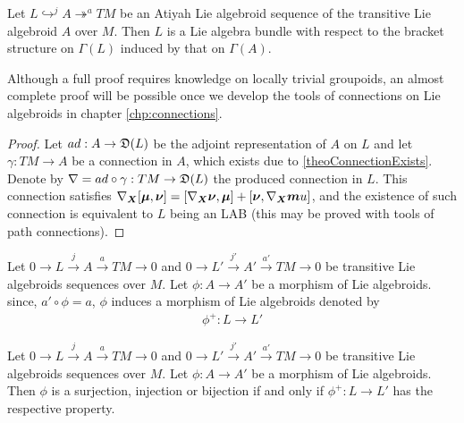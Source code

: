 \begin{theorem}\label{theoAdjointLAB} %
Let $L \hookrightarrow^j A \twoheadrightarrow^a TM$ be an Atiyah Lie algebroid sequence of the transitive Lie algebroid $A$ over $M$. Then $L$ is a Lie algebra bundle with respect to the bracket structure on $\Gamma(L)$ induced by that on $\Gamma(A)$.
\end{theorem}
Although a full proof requires knowledge on locally trivial groupoids, an almost complete proof will be possible once we develop the tools of connections on Lie algebroids in chapter \ref{chp:connections}. 
\begin{proof}
Let $ad: A \to \mathfrak{D}(L)$ be the adjoint representation of $A$ on $L$ and let $\gamma: TM \to A$ be a connection in $A$, which exists due to \ref{theoConnectionExists}. Denote by $\nabla = ad \circ \gamma : TM \to \mathfrak{D}(L)$ the produced connection in $L$. This connection satisfies $\nabla_{\bm{X}}[\bm{\mu}, \bm{\nu}] = [\nabla_{\bm{X}} \bm{\nu}, \bm{\mu}] + [\bm{\nu}, \nabla_{\bm{X}} \bm{m}u]$, and the existence of such connection is equivalent to $L$ being an LAB (this may be proved with tools of path connections).
\end{proof}

\begin{definition}\label{defnPhi+}
Let $0 \to L \xrightarrow{j} A \xrightarrow{a} TM \to 0$ and $0 \to L' \xrightarrow{j'} A' \xrightarrow{a'} TM \to 0$ be transitive Lie algebroids sequences over $M$. Let $\phi: A \to A'$ be a morphism of Lie algebroids. since, $a' \circ \phi = a$, $\phi$ induces a morphism of Lie algebroids denoted by
\begin{align*}
    \phi^+: L \to L'
\end{align*}
\end{definition}

\begin{proposition}
Let $0 \to L \xrightarrow{j} A \xrightarrow{a} TM \to 0$ and $0 \to L' \xrightarrow{j'} A' \xrightarrow{a'} TM \to 0$ be transitive Lie algebroids sequences over $M$. Let $\phi: A \to A'$ be a morphism of Lie algebroids. Then $\phi$ is a surjection, injection or bijection if and only if $\phi^+: L \to L'$ has the respective property.
\end{proposition}

